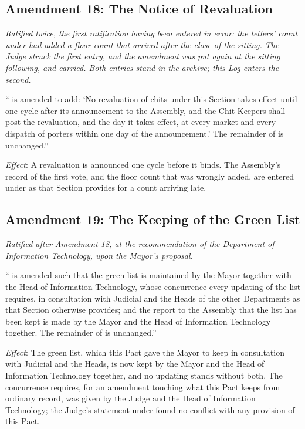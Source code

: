 \subsection*{Amendment 18: The Notice of Revaluation}

\textit{Ratified twice, the first ratification having been entered in error: the tellers' count under  had added a floor count that arrived after the close of the sitting. The Judge struck the first entry, and the amendment was put again at the sitting following, and carried. Both entries stand in the archive; this Log enters the second.}

`` is amended to add: `No revaluation of chits under this Section takes effect until one cycle after its announcement to the Assembly, and the Chit-Keepers shall post the revaluation, and the day it takes effect, at every market and every dispatch of porters within one day of the announcement.' The remainder of  is unchanged.''

\textit{Effect}: A revaluation is announced one cycle before it binds. The Assembly's record of the first vote, and the floor count that was wrongly added, are entered under  as that Section provides for a count arriving late.

\subsection*{Amendment 19: The Keeping of the Green List}

\textit{Ratified after Amendment 18, at the recommendation of the Department of Information Technology, upon the Mayor's proposal.}

`` is amended such that the green list is maintained by the Mayor together with the Head of Information Technology, whose concurrence every updating of the list requires, in consultation with Judicial and the Heads of the other Departments as that Section otherwise provides; and the report to the Assembly that the list has been kept is made by the Mayor and the Head of Information Technology together. The remainder of  is unchanged.''

\textit{Effect}: The green list, which this Pact gave the Mayor to keep in consultation with Judicial and the Heads, is now kept by the Mayor and the Head of Information Technology together, and no updating stands without both. The concurrence  requires, for an amendment touching what this Pact keeps from ordinary record, was given by the Judge and the Head of Information Technology; the Judge's statement under  found no conflict with any provision of this Pact.

